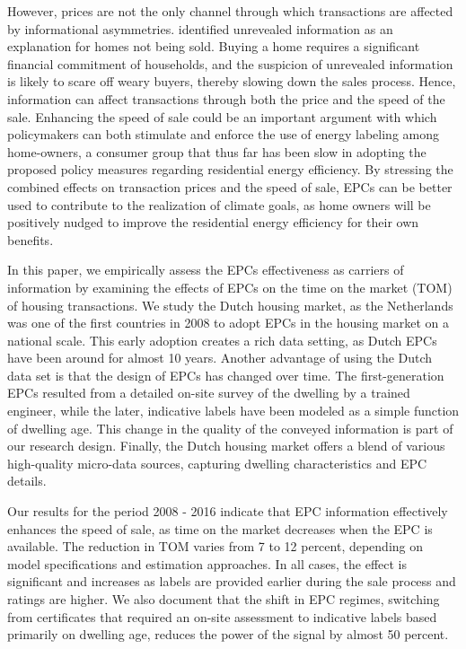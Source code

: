 \documentclass[12pt]{article}
\begin{document}
However, prices are not the only channel through which transactions are affected by informational asymmetries. \cite{taylor1999time} identified unrevealed information as an explanation for homes not being sold. Buying a home requires a significant financial commitment of households, and the suspicion of unrevealed information is likely to scare off weary buyers, thereby slowing down the sales process. Hence, information can affect transactions through both the price and the speed of the sale. Enhancing the speed of sale could be an important argument with which policymakers can both stimulate and enforce the use of energy labeling among home-owners, a consumer group that thus far has been slow in adopting the proposed policy measures regarding residential energy efficiency. By stressing the combined effects on transaction prices and the speed of sale, EPCs can be better used to contribute to the realization of climate goals, as home owners will be positively nudged to improve the residential energy efficiency for their own benefits.  

In this paper, we empirically assess the EPCs effectiveness as carriers of information by examining the effects of EPCs on the time on the market (TOM) of housing transactions. We study the Dutch housing market, as the Netherlands was one of the first countries in 2008 to adopt EPCs in the housing market on a national scale. This early adoption creates a rich data setting, as Dutch EPCs have been around for almost 10 years. Another advantage of using the Dutch data set is that the design of EPCs has changed over time. The first-generation EPCs resulted from a detailed on-site survey of the dwelling by a trained engineer, while the later, indicative labels have been modeled as a simple function of dwelling age. This change in the quality of the conveyed information is part of our research design. Finally, the Dutch housing market offers a blend of various high-quality micro-data sources, capturing dwelling characteristics and EPC details.

Our results for the period 2008 - 2016 indicate that EPC information effectively enhances the speed of sale, as time on the market decreases when the EPC is available. The reduction in TOM varies from 7 to 12 percent, depending on model specifications and estimation approaches. In all cases, the effect is significant and increases as labels are provided earlier during the sale process and ratings are higher. We also document that the shift in EPC regimes, switching from certificates that required an on-site assessment to indicative labels based primarily on dwelling age, reduces the power of the signal by almost 50 percent.
\end{document}
